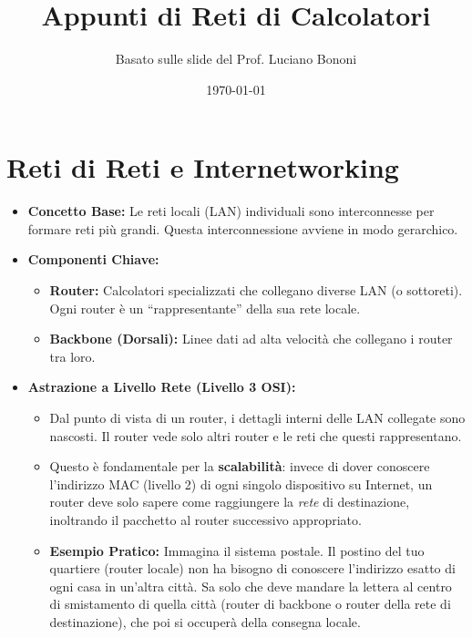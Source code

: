 


\title{Appunti di Reti di Calcolatori}
\author{Basato sulle slide del Prof. Luciano Bononi}
\date{\today}



\maketitle
\tableofcontents
\newpage

\section{Reti di Reti e Internetworking}
\begin{itemize}
    \item \textbf{Concetto Base:} Le reti locali (LAN) individuali sono interconnesse per formare reti più grandi. Questa interconnessione avviene in modo gerarchico.
    \item \textbf{Componenti Chiave:}
    \begin{itemize}
        \item \textbf{Router:} Calcolatori specializzati che collegano diverse LAN (o sottoreti). Ogni router è un ``rappresentante'' della sua rete locale.
        \item \textbf{Backbone (Dorsali):} Linee dati ad alta velocità che collegano i router tra loro.
    \end{itemize}
    \item \textbf{Astrazione a Livello Rete (Livello 3 OSI):}
    \begin{itemize}
        \item Dal punto di vista di un router, i dettagli interni delle LAN collegate sono nascosti. Il router vede solo altri router e le reti che questi rappresentano.
        \item Questo è fondamentale per la \textbf{scalabilità}: invece di dover conoscere l'indirizzo MAC (livello 2) di ogni singolo dispositivo su Internet, un router deve solo sapere come raggiungere la \textit{rete} di destinazione, inoltrando il pacchetto al router successivo appropriato.
        \item \textbf{Esempio Pratico:} Immagina il sistema postale. Il postino del tuo quartiere (router locale) non ha bisogno di conoscere l'indirizzo esatto di ogni casa in un'altra città. Sa solo che deve mandare la lettera al centro di smistamento di quella città (router di backbone o router della rete di destinazione), che poi si occuperà della consegna locale.

\end{itemize}
\end{itemize}
